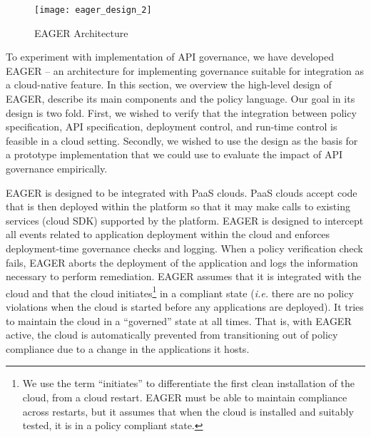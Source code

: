 \begin{figure*}[t]
\centering
\texttt{[image: eager\_design\_2]}
\caption{EAGER Architecture
\label{fig:eager_design}
}
\end{figure*}

To experiment with implementation of API governance, we have developed EAGER
-- an architecture for implementing governance suitable for integration
as a cloud-native feature.
In this section, we
overview the high-level design of EAGER, describe its main
components and the policy language.  Our goal in its design is two fold.
First, we wished to verify that the integration between policy specification,
API specification,
deployment control, and run-time control is feasible in a cloud setting.
Secondly, we wished to use the design as the basis for a prototype
implementation that we could use to evaluate the impact of API governance
empirically.

EAGER is designed to be integrated with PaaS clouds. 
PaaS clouds accept code that is then
deployed within the platform so that it may make calls to existing services
(cloud SDK) supported by the platform.
EAGER is designed to intercept all events related to application 
deployment within the cloud
and enforces deployment-time governance checks and
logging. 
When a policy verification check fails, 
EAGER aborts the deployment of the application and logs the information
necessary to perform remediation.  EAGER assumes that it is integrated with
the cloud and that the cloud initiates\footnote{We use the term
``initiates'' to differentiate the first clean installation of the cloud, from
a cloud restart.  EAGER must be able to maintain compliance across restarts,
but it assumes that when the cloud is installed and suitably tested, it is in
a policy compliant state.} 
in a compliant state ({\em i.e.} there are
no policy violations when the cloud is started before any applications are
deployed).  It tries to maintain the cloud
in a ``governed'' state at all times.  That is, with EAGER active, the cloud
is
automatically prevented from transitioning out of policy compliance due to a
change in the applications it hosts.



